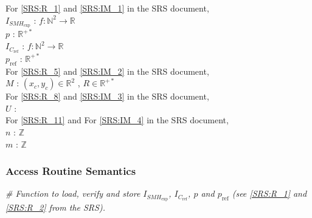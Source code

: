 \documentclass[12pt, titlepage]{article}
\begin{document}
\noindent For \cref{SRS:R_1} and \cref{SRS:IM_1} in the SRS document,\\
\noindent$I_{\mathit{SMH}_{\text{exp}}}$ : $f:\mathbb{N}^2\rightarrow\mathbb{R}$ 
\\
$p$ : $\mathbb{R}^{+*}$\\
$I_{C_{\text{ref}}}$ : $f:\mathbb{N}^2\rightarrow\mathbb{R}$\\
$p_{\text{ref}}$ : $\mathbb{R}^{+*}$ \\

\noindent For \cref{SRS:R_5} and \cref{SRS:IM_2} in the SRS document,\\
\noindent$M$ : $(x_c,y_c) \in \mathbb{R}^2$ , $R \in \mathbb{R}^{+*}$\\

\noindent For \cref{SRS:R_8} and \cref{SRS:IM_3} in the SRS document,\\
\noindent$U$ :\\ 

\noindent For \cref{SRS:R_11} and For \cref{SRS:IM_4} in the SRS document,\\
\noindent$n$ : $\mathbb{Z}$\\
$m$ : $\mathbb{Z}$\\
\fi

\subsubsection{Access Routine Semantics}

\noindent\textit{{\#} Function to load, verify and store 
$I_{\mathit{SMH}_{\text{exp}}}$, $I_{C_{\text{ref}}}$, $p$ and $p_{\text{ref}}$ 
(see \cref{SRS:R_1} and \cref{SRS:R_2} from the SRS).}
\medskip
\end{document}
